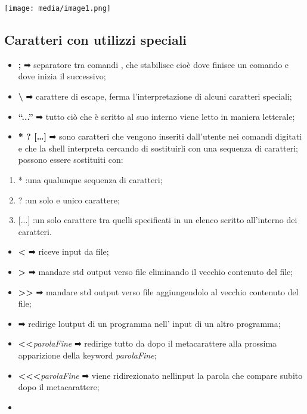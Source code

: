 \texttt{[image: media/image1.png]}

\subsection{Caratteri con utilizzi
speciali}\label{caratteri-con-utilizzi-speciali}

\begin{itemize}
\item
  \textbf{;} ➡ separatore tra comandi , che stabilisce cioè dove finisce
  un comando e dove inizia il successivo;
\item
  \textbf{\textbackslash{}} ➡ carattere di escape, ferma
  l'interpretazione di alcuni caratteri speciali;
\item
  \textbf{``...''} ➡ tutto ciò che è scritto al suo interno viene letto
  in maniera letterale;
\item
  \textbf{* ? {[}\ldots{]}} ➡ sono caratteri che vengono inseriti
  dall'utente nei comandi digitati e che la shell interpreta cercando di
  sostituirli con una sequenza di caratteri; possono essere sostituiti
  con:
\end{itemize}

\begin{enumerate}
\def\labelenumi{\arabic{enumi}.}
\item
  * :una qualunque sequenza di caratteri;
\item
  ? :un solo e unico carattere;
\item
  {[}...{]} :un solo carattere tra quelli specificati in un elenco
  scritto all'interno dei caratteri.
\end{enumerate}

\begin{itemize}
\item
  \textbf{\textless{}} ➡ riceve input da file;
\item
  \textbf{\textgreater{}} ➡ mandare std output verso file eliminando il
  vecchio contenuto del file;
\item
  \textbf{\textgreater\textgreater{}} ➡ mandare std output verso file
  aggiungendolo al vecchio contenuto del file;
\item
  \textbf{\textbar{}} ➡ redirige l\textquotesingle output di un
  programma nell' input di un altro programma;
\item
  \textbf{\textless\textless{}}\emph{parolaFine} ➡ redirige tutto da
  dopo il metacarattere alla prossima apparizione della keyword
  \emph{parolaFine};
\item
  \textbf{\textless\textless\textless{}}\emph{parolaFine} ➡ viene
  ridirezionato nell\textquotesingle input la parola che compare subito
  dopo il metacarattere;
\item
\end{itemize}

